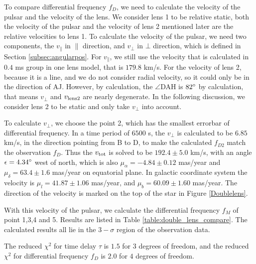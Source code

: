 \documentclass[useAMS,usenatbib]{mn2e}
\begin{document}
To compare differential frequency $f_D$, we need to calculate the velocity of the pulsar and the velocity of the lens. We consider lens 1 to be relative static, both the velocity of the pulsar and the velocity of lens 2 mentioned later are the relative velocities to lens 1.
To calculate the velocity of the pulsar, we need two components, the $v_{\parallel}$ in ${\parallel}$ direction, and $v_{\bot}$ in ${\bot}$ direction, which is defined in Section \ref{subsec:angularpos}. For $v_{\parallel}$, we still use the velocity that is calculated in $0.4$ ms group in one lens model, that is $179.8$ km/s. For the velocity of lens 2, because it is a line, and we do not consider radial velocity, so it could only be in the direction of AJ. However, by calculation, the $\angle$DAH is $82\degree$ by calculation, that means $v_{\bot}$ and $v_{\rm lens2}$ are nearly degenerate. In the following discussion, we consider lens 2 to be static and only take $v_{\bot}$ into account.

To calculate $v_{\bot}$, we choose the point 2, which has the smallest errorbar of differential frequency. In a time period of $6500$ s, the $v_{\bot}$ is calculated to be $6.85$ km/s, in the direction pointing from B to D, to make the calculated $f_{D2}$ match the observation $f_D$. Thus the $v_{\rm tot}$ is solved to be $192.4\pm 5.0$ km/s, with an angle $\epsilon=4.34\degree$ west of north, which is also $\mu_\alpha=-4.84\pm0.12$ mas/year and $\mu_\delta=63.4\pm 1.6$ mas/year on equatorial plane. In galactic coordinate system the velocity is $\mu_l=41.87\pm 1.06$ mas/year, and $\mu_b=60.09 \pm 1.60$ mas/year. %
The direction of the velocity is marked on the top of the star in Figure \ref{Doublelens}.

With this velocity of the pulsar, we calculate the differential frequency $f_M$ of point 1,3,4 and 5. Results are listed in Table \ref{table:double_lens_compare}. The calculated results all lie in the $3-\sigma$ region of the observation data. 

The reduced ${\chi}^2$ for time delay $\tau$ is $1.5$ for $3$ degrees of freedom, and the reduced ${\chi}^2$ for differential frequency $f_D$ is $2.0$ for $4$ degrees of freedom.
\end{document}
